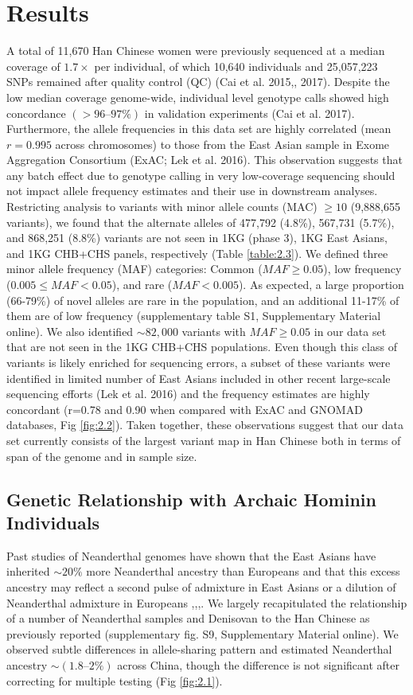 \section{Results}
A total of 11,670 Han Chinese women were previously sequenced at a median coverage of $1.7\times$ per individual, of which 10,640 individuals and 25,057,223 SNPs remained after quality control (QC) (Cai et al. 2015,, 2017). Despite the low median coverage genome-wide, individual level genotype calls showed high concordance $(>96–97\%)$ in validation experiments (Cai et al. 2017). Furthermore, the allele frequencies in this data set are highly correlated (mean $r=0.995$ across chromosomes) to those from the East Asian sample in Exome Aggregation Consortium (ExAC; Lek et al. 2016). This observation suggests that any batch effect due to genotype calling in very low-coverage sequencing should not impact allele frequency estimates and their use in downstream analyses.
Restricting analysis to variants with minor allele counts (MAC) $\ge10$ (9,888,655 variants), we found that the alternate alleles of 477,792 (4.8\%), 567,731 (5.7\%), and 868,251 (8.8\%) variants are not seen in 1KG (phase 3), 1KG East Asians, and 1KG CHB+CHS panels, respectively (Table \ref{table:2.3}). We defined three minor allele frequency (MAF) categories: Common ($MAF \ge 0.05$), low frequency ($0.005\le MAF < 0.05$), and rare ($MAF < 0.005$). As expected, a large proportion (66-79\%) of novel alleles are rare in the population, and an additional 11-17\% of them are of low frequency (supplementary table S1, Supplementary Material online). We also identified $\sim82,000$ variants with $MAF \ge 0.05$ in our data set that are not seen in the 1KG CHB+CHS populations. Even though this class of variants is likely enriched for sequencing errors, a subset of these variants were identified in limited number of East Asians included in other recent large-scale sequencing efforts (Lek et al. 2016) and the frequency estimates are highly concordant (r=0.78 and 0.90 when compared with ExAC and GNOMAD databases, Fig \ref{fig:2.2}). Taken together, these observations suggest that our data set currently consists of the largest variant map in Han Chinese both in terms of span of the genome and in sample size.
\subsection{Genetic Relationship with Archaic Hominin Individuals}
Past studies of Neanderthal genomes have shown that the East Asians have inherited $\sim20\%$ more Neanderthal ancestry than Europeans and that this excess ancestry may reflect a second pulse of admixture in East Asians or a dilution of Neanderthal admixture in Europeans \cite{prfer2014complete},\cite{sankararaman2014genomic},\cite{vernot2014resurrecting},\cite{kim2015selection}. We largely recapitulated the relationship of a number of Neanderthal samples and Denisovan to the Han Chinese as previously reported (supplementary fig. S9, Supplementary Material online). We observed subtle differences in allele-sharing pattern and estimated Neanderthal ancestry $\sim(1.8–2\%)$ across China, though the difference is not significant after correcting for multiple testing (Fig \ref{fig:2.1}).
